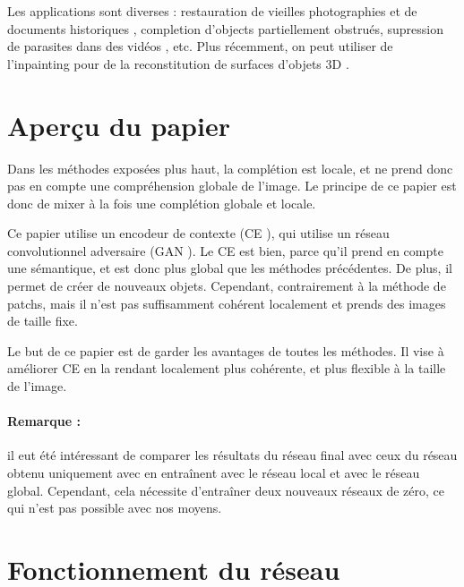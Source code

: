 \documentclass[12pt]{article}
\begin{document}
Les applications sont diverses : restauration de vieilles photographies et de documents historiques \cite{bertalmio2000}, completion d'objects partiellement obstrués, supression de parasites dans des vidéos \cite{wexler2007}, etc. Plus récemment, on peut utiliser de l'inpainting pour de la reconstitution de surfaces d'objets 3D \cite{bobenko2005} \cite{harary2014}.

\section{Aperçu du papier}

Dans les méthodes exposées plus haut, la complétion est locale, et ne prend donc pas en compte une compréhension globale de l'image. Le principe de ce papier est donc de mixer à la fois une complétion globale et locale.

Ce papier utilise un encodeur de contexte (CE \cite{pathak2016}), qui utilise un réseau convolutionnel adversaire (GAN \cite{goodfellow2014}). Le CE est bien, parce qu'il prend en compte une sémantique, et est donc plus global que les méthodes précédentes. De plus, il permet de créer de nouveaux objets. Cependant, contrairement à la méthode de patchs, mais il n'est pas suffisamment cohérent localement et prends des images de taille fixe.

Le but de ce papier est de garder les avantages de toutes les méthodes. Il vise à améliorer CE en la rendant localement plus cohérente, et plus flexible à la taille de l'image.


\paragraph{Remarque :} il eut été intéressant de comparer les résultats du réseau final avec ceux du réseau obtenu uniquement avec en entraînent avec le réseau local et avec le réseau global. Cependant, cela nécessite d'entraîner deux nouveaux réseaux de zéro, ce qui n'est pas possible avec nos moyens.

\section{Fonctionnement du réseau}
\end{document}
